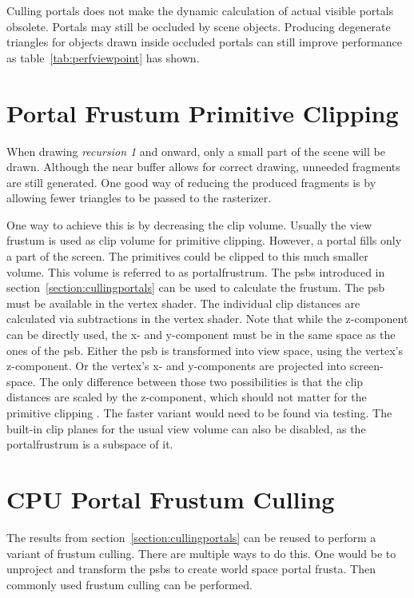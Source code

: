 Culling portals does not make the dynamic calculation of actual visible portals obsolete. Portals may still be occluded by scene objects. Producing degenerate triangles for objects drawn inside occluded portals can still improve performance as table~\ref{tab:perfviewpoint} has shown.

\section{Portal Frustum Primitive Clipping}
\label{section:portalprimitiveclipping}

When drawing \textit{recursion 1} and onward, only a small part of the scene will be drawn. Although the near buffer allows for correct drawing, unneeded fragments are still generated. One good way of reducing the produced fragments is by allowing fewer triangles to be passed to the rasterizer. 

One way to achieve this is by decreasing the clip volume. Usually the view frustum is used as clip volume for primitive clipping. However, a portal fills only a part of the screen. The primitives could be clipped to this much smaller volume. This volume is referred to as \gls{portalfrustrum}. The \glspl{psb} introduced in section~\ref{section:cullingportals} can be used to calculate the frustum. The \gls{psb} must be available in the vertex shader. The individual clip distances are calculated via subtractions in the vertex shader. Note that while the z-component can be directly used, the x- and y-component must be in the same space as the ones of the \gls{psb}. Either the \gls{psb} is transformed into view space, using the vertex's z-component. Or the vertex's x- and y-components are projected into screen-space. The only difference between those two possibilities is that the clip distances are scaled by the z-component, which should not matter for the primitive clipping \cite{khronos:vulkan:spec1.1}. The faster variant would need to be found via testing. The built-in clip planes for the usual view volume can also be disabled, as the \gls{portalfrustrum} is a subspace of it.

\section{CPU Portal Frustum Culling}
\label{section:portalfrustumculling}
The results from section~\ref{section:cullingportals} can be reused to perform a variant of frustum culling. There are multiple ways to do this. One would be to unproject and transform the \glspl{psb} to create world space portal frusta. Then commonly used frustum culling can be performed.

